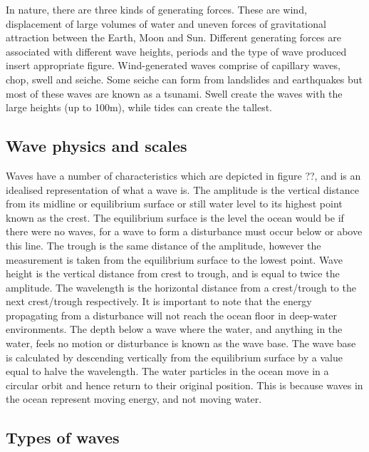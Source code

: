 \documentclass[]{article}
\begin{document}
In nature, there are three kinds of generating forces. These are wind,
displacement of large volumes of water and uneven forces of
gravitational attraction between the Earth, Moon and Sun. Different
generating forces are associated with different wave heights, periods
and the type of wave produced insert appropriate figure. Wind-generated
waves comprise of capillary waves, chop, swell and seiche. Some seiche
can form from landslides and earthquakes but most of these waves are
known as a tsunami. Swell create the waves with the large heights (up to
100m), while tides can create the tallest.

\hypertarget{wave-physics-and-scales}{%
\subsection{Wave physics and scales}\label{wave-physics-and-scales}}

Waves have a number of characteristics which are depicted in figure ??,
and is an idealised representation of what a wave is. The amplitude is
the vertical distance from its midline or equilibrium surface or still
water level to its highest point known as the crest. The equilibrium
surface is the level the ocean would be if there were no waves, for a
wave to form a disturbance must occur below or above this line. The
trough is the same distance of the amplitude, however the measurement is
taken from the equilibrium surface to the lowest point. Wave height is
the vertical distance from crest to trough, and is equal to twice the
amplitude. The wavelength is the horizontal distance from a crest/trough
to the next crest/trough respectively. It is important to note that the
energy propagating from a disturbance will not reach the ocean floor in
deep-water environments. The depth below a wave where the water, and
anything in the water, feels no motion or disturbance is known as the
wave base. The wave base is calculated by descending vertically from the
equilibrium surface by a value equal to halve the wavelength. The water
particles in the ocean move in a circular orbit and hence return to
their original position. This is because waves in the ocean represent
moving energy, and not moving water.

\hypertarget{types-of-waves}{%
\subsection{Types of waves}\label{types-of-waves}}
\end{document}

